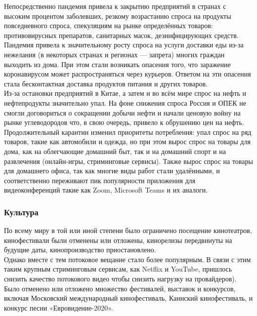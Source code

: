 \documentclass[a4paper, 12pt]{extarticle}
\begin{document}
Непосредственно пандемия привела к закрытию предприятий в странах с высоким
процентом заболевших, резкому возрастанию спроса на продукты повседневного
спроса, спекуляциям на рынке определённых товаров: противовирусных препаратов,
санитарных масок, дезинфицирующих средств.
\\

Пандемия привела к значительному росту спроса на услуги доставки еды из-за
нежелания (в некоторых странах и регионах — запрета) многих граждан выходить из
дома. При этом стали возникать опасения того, что заражение коронавирусом может
распространяться через курьеров. Ответом на эти опасения стала бесконтактная
доставка продуктов питания и других товаров.
\\

Из-за остановки предприятий в Китае, а затем и во всём мире спрос на нефть и
нефтепродукты значительно упал. На фоне снижения спроса Россия и ОПЕК не смогли
договориться о сокращении добычи нефти и начали ценовую войну на рынке
углеводородов что, в свою очередь, привело к обрушению цен на нефть.
\\

Продолжительный карантин изменил приоритеты потребления: упал спрос на ряд
товаров, такие как автомобили и одежда, но при этом вырос спрос на товары для
дома, как на облегчающие домашний быт, так и на домашний спорт и на развлечения
(онлайн-игры, стриминговые сервисы). Также вырос спрос на товары для домашнего
офиса, так как многие виды работ стали удалёнными, и соответственно переживают
пик популярности приложения для видеоконференций такие как Zoom, Microsoft
Teams и их аналоги.

\subsubsection{Культура}
По всему миру в той или иной степени было ограничено посещение кинотеатров,
кинофестивали были отменены или отложены, кинорелизы передвинуты на будущие
даты, кинопроизводство приостановлено.
\\

Однако вместе с тем потоковое вещание стало более популярным. В связи с этим
таким крупным стриминговым сервисам, как Netflix и YouTube, пришлось снизить качество потокового видео чтобы
снизить нагрузку на провайдеров).
\\

Было отменено или отложено множество фестивалей, выставок и конкурсов, включая
Московский международный кинофестиваль, Каннский кинофестиваль, и конкурс песни
«Евровидение-2020».
\\
\end{document}
